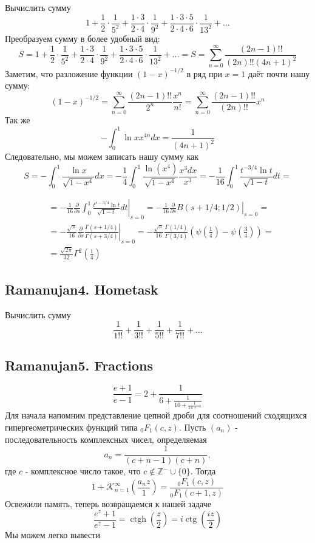 	Вычислить сумму
	$$
	1+\frac{1}{2} \cdot \frac{1}{5^2}+\frac{1 \cdot 3}{2 \cdot 4} \cdot \frac{1}{9^2}+\frac{1 \cdot 3 \cdot 5}{2 \cdot 4 \cdot 6} \cdot \frac{1}{13^2}+\ldots
	$$
	Преобразуем сумму в более удобный вид:
	$$
	S=1+\frac{1}{2} \cdot \frac{1}{5^2}+\frac{1 \cdot 3}{2 \cdot 4} \cdot \frac{1}{9^2}+\frac{1 \cdot 3 \cdot 5}{2 \cdot 4 \cdot 6} \cdot \frac{1}{13^2}+\ldots=S=\sum_{n=0}^{\infty} \frac{(2 n-1) ! !}{(2 n) ! !(4 n+1)^2}
	$$
	Заметим, что разложение функции $(1-x)^{-1 / 2}$ в ряд при $x=1$ даёт почти нашу сумму:
	$$
	(1-x)^{-1 / 2}=\sum_{n=0}^{\infty} \frac{(2 n-1) ! !}{2^n} \frac{x^n}{n !}=\sum_{n=0}^{\infty} \frac{(2 n-1) ! !}{(2 n) ! !} x^n
	$$
	Так же
	$$
	-\int_0^1 \ln x x^{4 n} d x=\frac{1}{(4 n+1)^2}
	$$
	Следовательно, мы можем записать нашу сумму как
	$$
	S=-\int_0^1 \frac{\ln x}{\sqrt{1-x^4}} d x=-\frac{1}{4} \int_0^1 \frac{\ln \left(x^4\right)}{\sqrt{1-x^4}} \frac{x^3 d x}{x^3}=-\frac{1}{16} \int_0^1 \frac{t^{-3 / 4} \ln t}{\sqrt{1-t}} d t=
	$$
	
	$$
	\begin{aligned}
		& =-\left.\frac{1}{16} \frac{\partial}{\partial s} \int_0^1 \frac{t^{s-3 / 4} \ln t}{\sqrt{1-t}} d t\right|_{s=0}=-\left.\frac{1}{16} \frac{\partial}{\partial s} B(s+1 / 4 ; 1 / 2)\right|_{s=0}= \\
		& =-\left.\frac{\sqrt{\pi}}{16} \frac{\partial}{\partial s} \frac{\Gamma(s+1 / 4)}{\Gamma(s+3 / 4)}\right|_{s=0}=-\frac{\sqrt{\pi}}{16} \frac{\Gamma(1 / 4)}{\Gamma(3 / 4)}\left(\psi\left(\frac{1}{4}\right)-\psi\left(\frac{3}{4}\right)\right)= \\
		& =\frac{\sqrt{2 \pi}}{32} \Gamma^2\left(\frac{1}{4}\right)
	\end{aligned}
	$$
	
	\subsection{Ramanujan4. Hometask}
	
	Вычислить сумму
	$$
	\frac{1}{1 ! !}+\frac{1}{3 ! !}+\frac{1}{5 ! !}+\frac{1}{7 ! !}+\ldots
	$$
	
	\subsection{Ramanujan5. Fractions}
	$$
	\frac{e+1}{e-1}=2+\frac{1}{6+\frac{1}{10+\frac{1}{14+\cdots}}}
	$$
	Для начала напомним представление цепной дроби для соотношений сходящихся гипергеометрических функций типа ${ }_0 F_1(c, z)$. Пусть $\left(a_n\right)$ - последовательность комплексных чисел, определяемая
	$$
	a_n=\frac{1}{(c+n-1)(c+n)},
	$$
	где $c$ - комплексное число такое, что $c \notin \mathbb{Z}^{-} \cup\{0\}$. Тогда
	$$
	1+\mathcal{K}_{n=1}^{\infty}\left(\frac{a_n z}{1}\right)=\frac{{ }_0 F_1(c, z)}{{ }_0 F_1(c+1, z)}
	$$
	Освежили память, теперь возвращаемся $к$ нашей задаче
	$$
	\frac{e^z+1}{e^z-1}=\operatorname{ctgh}\left(\frac{z}{2}\right)=i \operatorname{ctg}\left(\frac{i z}{2}\right)
	$$
	Мы можем легко вывести
	
